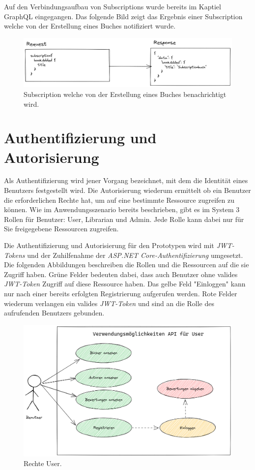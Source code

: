Auf den Verbindungsaufbau von Subscriptions wurde bereits im Kaptiel GraphQL eingegangen.
Das folgende Bild zeigt das Ergebnis einer Subscription welche von der Erstellung eines Buches notifiziert wurde.

\begin{figure}[H]
    \includegraphics[width=\textwidth]{pics/bookSubscription.png}
    \caption{Subscription welche von der Erstellung eines Buches benachrichtigt wird.}
\end{figure}

\section{Authentifizierung und Autorisierung}
Als Authentifizierung wird jener Vorgang bezeichnet, mit dem die Identität eines Benutzers festgestellt wird.
Die Autorisierung wiederum ermittelt ob ein Benutzer die erforderlichen Rechte hat, um auf eine bestimmte Ressource zugreifen zu können.
Wie im Anwendungsszenario bereits beschrieben, gibt es im System 3 Rollen für Benutzer: User, Librarian und Admin.
Jede Rolle kann dabei nur für Sie freigegebene Ressourcen zugreifen.
\newline

Die Authentifizierung und Autorisierung für den Prototypen wird mit \textit{JWT-Tokens} und der Zuhilfenahme der \textit{ASP.NET Core-Authentifizierung} umgesetzt.
Die folgenden Abbildungen beschreiben die Rollen und die Ressourcen auf die sie Zugriff haben.
Grüne Felder bedeuten dabei, dass auch Benutzer ohne valides \textit{JWT-Token} Zugriff auf diese Ressource haben.
Das gelbe Feld "Einloggen" kann nur nach einer bereits erfolgten Registrierung aufgerufen werden.
Rote Felder wiederum verlangen ein valides \textit{JWT-Token} und sind an die Rolle des aufrufenden Benutzers gebunden.

\begin{figure}[H]
    \includegraphics[width=\textwidth]{pics/UseCaseUser.png}
    \caption{Rechte User.}
\end{figure}


